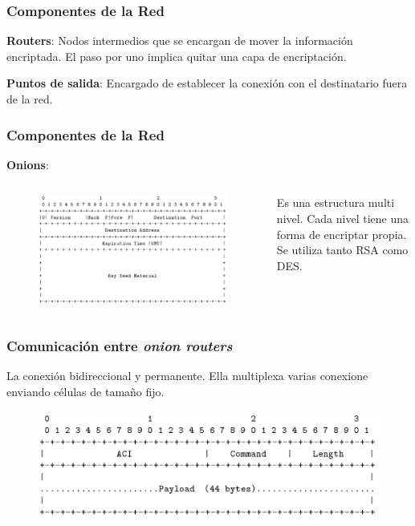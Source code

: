 \documentclass{beamer}
\newcommand{\vspc}{\vspace{0.5cm}}
\begin{document}
\begin{frame}
    \frametitle{Componentes de la Red}
    \textbf{Routers}: Nodos intermedios que se encargan de mover la información encriptada. El paso por uno implica quitar una capa de encriptación.
    
    \vspc

    \textbf{Puntos de salida}: Encargado de establecer la conexión con el destinatario fuera de la red. 

\end{frame}

\begin{frame}
    \frametitle{Componentes de la Red}
   
    \textbf{Onions}:
    \begin{columns}
            \begin{figure}
            \centering
                \includegraphics[scale=0.18]{onionConecct.png}
            \end{figure}
        
        Es una estructura multi nivel. Cada nivel tiene una forma de encriptar propia. Se utiliza tanto RSA como DES.
    \end{columns}
\end{frame}

\begin{frame}
    \frametitle{Comunicación entre \textit{onion routers}}

    La conexión bidireccional y permanente. Ella multiplexa varias conexione enviando células de tamaño fijo.

    \begin{figure}[h]
        \centering
        \includegraphics[scale=0.3]{cell.png}
    \end{figure}
\end{frame}
\end{document}
